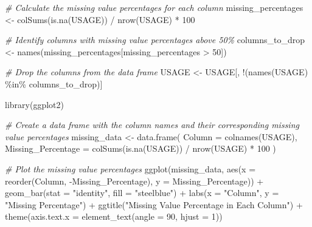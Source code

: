 \documentclass[
]{article}
\newenvironment{Shaded}{\begin{snugshade}}{\end{snugshade}}
\newcommand{\AttributeTok}[1]{\textcolor[rgb]{0.77,0.63,0.00}{#1}}
\newcommand{\CommentTok}[1]{\textcolor[rgb]{0.56,0.35,0.01}{\textit{#1}}}
\newcommand{\DecValTok}[1]{\textcolor[rgb]{0.00,0.00,0.81}{#1}}
\newcommand{\FunctionTok}[1]{\textcolor[rgb]{0.00,0.00,0.00}{#1}}
\newcommand{\NormalTok}[1]{#1}
\newcommand{\OtherTok}[1]{\textcolor[rgb]{0.56,0.35,0.01}{#1}}
\newcommand{\SpecialCharTok}[1]{\textcolor[rgb]{0.00,0.00,0.00}{#1}}
\newcommand{\StringTok}[1]{\textcolor[rgb]{0.31,0.60,0.02}{#1}}
\begin{document}
\begin{Shaded}
\begin{Highlighting}[]
\CommentTok{\# Calculate the missing value percentages for each column}
\NormalTok{missing\_percentages }\OtherTok{\textless{}{-}} \FunctionTok{colSums}\NormalTok{(}\FunctionTok{is.na}\NormalTok{(USAGE)) }\SpecialCharTok{/} \FunctionTok{nrow}\NormalTok{(USAGE) }\SpecialCharTok{*} \DecValTok{100}

\CommentTok{\# Identify columns with missing value percentages above 50\%}
\NormalTok{columns\_to\_drop }\OtherTok{\textless{}{-}} \FunctionTok{names}\NormalTok{(missing\_percentages[missing\_percentages }\SpecialCharTok{\textgreater{}} \DecValTok{50}\NormalTok{])}

\CommentTok{\# Drop the columns from the data frame}
\NormalTok{USAGE }\OtherTok{\textless{}{-}}\NormalTok{ USAGE[, }\SpecialCharTok{!}\NormalTok{(}\FunctionTok{names}\NormalTok{(USAGE) }\SpecialCharTok{\%in\%}\NormalTok{ columns\_to\_drop)]}
\end{Highlighting}
\end{Shaded}

\begin{Shaded}
\begin{Highlighting}[]
\FunctionTok{library}\NormalTok{(ggplot2)}

\CommentTok{\# Create a data frame with the column names and their corresponding missing value percentages}
\NormalTok{missing\_data }\OtherTok{\textless{}{-}} \FunctionTok{data.frame}\NormalTok{(}
  \AttributeTok{Column =} \FunctionTok{colnames}\NormalTok{(USAGE),}
  \AttributeTok{Missing\_Percentage =} \FunctionTok{colSums}\NormalTok{(}\FunctionTok{is.na}\NormalTok{(USAGE)) }\SpecialCharTok{/} \FunctionTok{nrow}\NormalTok{(USAGE) }\SpecialCharTok{*} \DecValTok{100}
\NormalTok{)}

\CommentTok{\# Plot the missing value percentages}
\FunctionTok{ggplot}\NormalTok{(missing\_data, }\FunctionTok{aes}\NormalTok{(}\AttributeTok{x =} \FunctionTok{reorder}\NormalTok{(Column, }\SpecialCharTok{{-}}\NormalTok{Missing\_Percentage), }\AttributeTok{y =}\NormalTok{ Missing\_Percentage)) }\SpecialCharTok{+}
  \FunctionTok{geom\_bar}\NormalTok{(}\AttributeTok{stat =} \StringTok{"identity"}\NormalTok{, }\AttributeTok{fill =} \StringTok{"steelblue"}\NormalTok{) }\SpecialCharTok{+}
  \FunctionTok{labs}\NormalTok{(}\AttributeTok{x =} \StringTok{"Column"}\NormalTok{, }\AttributeTok{y =} \StringTok{"Missing Percentage"}\NormalTok{) }\SpecialCharTok{+}
  \FunctionTok{ggtitle}\NormalTok{(}\StringTok{"Missing Value Percentage in Each Column"}\NormalTok{) }\SpecialCharTok{+}
  \FunctionTok{theme}\NormalTok{(}\AttributeTok{axis.text.x =} \FunctionTok{element\_text}\NormalTok{(}\AttributeTok{angle =} \DecValTok{90}\NormalTok{, }\AttributeTok{hjust =} \DecValTok{1}\NormalTok{))}
\end{Highlighting}
\end{Shaded}
\end{document}
